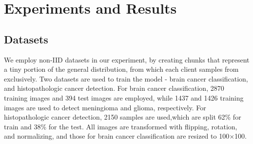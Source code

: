 


\section{Experiments and Results}

\subsection{Datasets}
We employ non-IID datasets in our experiment, by creating chunks that represent a tiny portion of the general distribution, from which each client samples from exclusively. Two datasets are used to train the model - brain cancer classification, and histopathologic cancer detection. For brain cancer classification, 2870 training images and 394 test images are employed, while 1437 and 1426 training images are used to detect meningioma and glioma, respectively. For histopathologic cancer detection, 2150 samples are used,which are split 62\% for train and 38\% for the test. All images are transformed with flipping, rotation, and normalizing, and those for brain cancer classification are resized to 100$\times$100.
